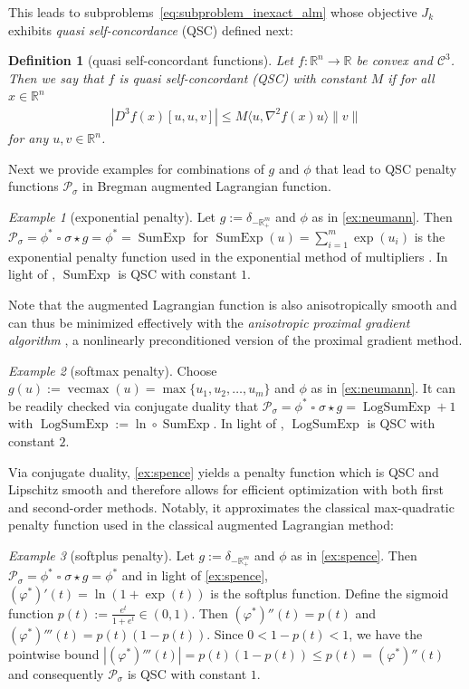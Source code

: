 \documentclass[11pt,onecolumn]{article}
\DeclareMathOperator{\infconv}{\mathbin{\square}}
\DeclareMathOperator{\logsumexp}{LogSumExp}
\DeclareMathOperator{\vecmax}{vecmax}
\DeclareMathOperator{\sumexp}{SumExp}
\newcommand{\bR}{\mathbb{R}}
\newtheorem{definition}[definition]{Definition}
\theoremstyle{remark}
\newtheorem{example}[example]{Example}
\begin{document}
This leads to subproblems~\cref{eq:subproblem_inexact_alm} whose objective $J_k$ exhibits \emph{quasi self-concordance} (QSC) \cite{bach2010self,doikov2025minimizing} defined next:
\begin{definition}[quasi self-concordant functions]
Let $f :\bR^n \to \bR$ be convex and $\mathcal{C}^3$. Then we say that $f$ is \emph{quasi self-concordant} (QSC) with constant $M$ if for all $x \in \bR^n$
\begin{align}
| D^3 f(x)[u,u, v] | \leq M \langle u, \nabla^2 f(x) u\rangle \|v\|
\end{align}
for any $u,v\in \bR^n$.
\end{definition}
Next we provide examples for combinations of $g$ and $\phi$ that lead to QSC penalty functions $\mathcal{P}_\sigma$ in Bregman augmented Lagrangian function.
\begin{example}[exponential penalty] \label{ex:exp}
Let $g:=\delta_{-\bR^m_+}$ and $\phi$ as in \cref{ex:neumann}. Then $\mathcal{P}_\sigma=\phi^* \infconv \sigma \star g=\phi^*=\sumexp$ for $\sumexp(u)=\sum_{i=1}^m \exp(u_i)$ is the exponential penalty function used in the exponential method of multipliers \cite{tseng1993convergence}.
 In light of \cite{doikov2025minimizing}, $\sumexp$ is QSC with constant $1$.
\end{example}
Note that the augmented Lagrangian function is also anisotropically smooth \cite[Definition 3.1]{laude2025anisotropic} and can thus be minimized effectively with the \emph{anisotropic proximal gradient algorithm} \cite{laude2025anisotropic}, a nonlinearly preconditioned version of the proximal gradient method.

\begin{example}[softmax penalty] \label{ex:softmax}
    Choose $g(u):=\vecmax(u)=\max\{u_1, u_2, \ldots, u_m\}$ and $\phi$ as in \cref{ex:neumann}. It can be readily checked via conjugate duality that $\mathcal{P}_\sigma=\phi^* \infconv \sigma \star g=\logsumexp+1$ with $\logsumexp:=\ln \circ \sumexp$.
    In light of \cite{doikov2025minimizing}, $\logsumexp$ is QSC with constant $2$.
\end{example}
Via conjugate duality, \cref{ex:spence} yields a penalty function which is QSC and Lipschitz smooth and therefore allows for efficient optimization with both first and second-order methods.
Notably, it approximates the classical max-quadratic penalty function used in the classical augmented Lagrangian method:
\begin{example}[softplus penalty] \label{ex:softplus}
  Let $g:=\delta_{-\bR^m_+}$ and $\phi$ as in \cref{ex:spence}. Then $\mathcal{P}_\sigma=\phi^* \infconv \sigma \star g=\phi^*$ and in light of \cref{ex:spence}, $(\varphi^*)'(t)=\ln(1+\exp(t))$ is the softplus function. Define the sigmoid function $p(t):=\frac{e^t}{1+e^t}\in(0,1)$. Then $(\varphi^*)''(t)=p(t)$ and $(\varphi^*)'''(t)=p(t)(1-p(t))$.
Since $0<1-p(t)<1$, we have the pointwise bound $|(\varphi^*)'''(t)| = p(t)(1-p(t))\leq p(t) =(\varphi^*)''(t)$ and consequently $\mathcal{P}_\sigma$ is QSC with constant $1$.
\end{example}
\end{document}
